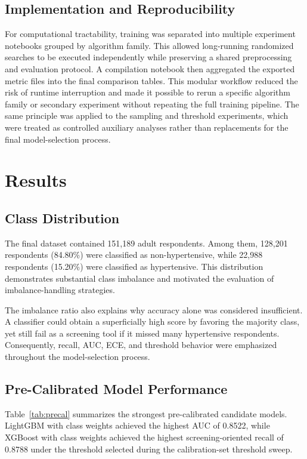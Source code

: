 \documentclass[journal]{IEEEtran}
\begin{document}
\subsection{Implementation and Reproducibility}
For computational tractability, training was separated into multiple experiment notebooks grouped by algorithm family. This allowed long-running randomized searches to be executed independently while preserving a shared preprocessing and evaluation protocol. A compilation notebook then aggregated the exported metric files into the final comparison tables. This modular workflow reduced the risk of runtime interruption and made it possible to rerun a specific algorithm family or secondary experiment without repeating the full training pipeline. The same principle was applied to the sampling and threshold experiments, which were treated as controlled auxiliary analyses rather than replacements for the final model-selection process.

\section{Results}

\subsection{Class Distribution}
The final dataset contained 151,189 adult respondents. Among them, 128,201 respondents (84.80\%) were classified as non-hypertensive, while 22,988 respondents (15.20\%) were classified as hypertensive. This distribution demonstrates substantial class imbalance and motivated the evaluation of imbalance-handling strategies.

The imbalance ratio also explains why accuracy alone was considered insufficient. A classifier could obtain a superficially high score by favoring the majority class, yet still fail as a screening tool if it missed many hypertensive respondents. Consequently, recall, AUC, ECE, and threshold behavior were emphasized throughout the model-selection process.

\subsection{Pre-Calibrated Model Performance}
Table~\ref{tab:precal} summarizes the strongest pre-calibrated candidate models. LightGBM with class weights achieved the highest AUC of 0.8522, while XGBoost with class weights achieved the highest screening-oriented recall of 0.8788 under the threshold selected during the calibration-set threshold sweep.
\end{document}
